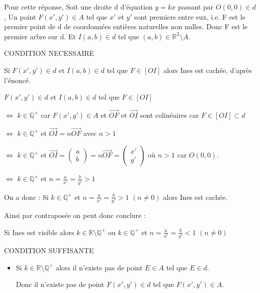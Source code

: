 \begin{tfjmenum}

Pour cette réponse,
Soit une droite d d'équation $y = kx$ passant par $O(0,0)\in d$,
Un point $F(x',y')\in A$ tel que $x'$ et $y'$ sont premiers entre eux, i.e. F est le premier point de d de coordonnées entières naturelles non nulles. Donc F est le premier arbre sur d.
Et $I(a,b)\in d$ tel que $(a,b)\in\mathbb{R}^2 \setminus A$.

\item

CONDITION NECESSAIRE

Si $F(x',y')\in d$ et $I(a,b)\in d$ tel que $F\in [OI]$ alors Ines est cachée, d'après l'énoncé.

$F(x',y')\in d$ et $I(a,b)\in d$ tel que $F\in [OI]$

$\Leftrightarrow$ $k\in \mathbb{Q}^+$ car $F(x',y')\in A$ et $\vec{OF}$ et $\vec{OI}$ sont colinéaires car $F\in [OI]\subset d$

$\Leftrightarrow$ $k\in \mathbb{Q}^+$ et $\vec{OI}=n\vec{OF}$ avec $n>1$

$\Leftrightarrow$ $k\in \mathbb{Q}^+$ et $\vec{OI}=\begin{pmatrix} a \\ b \end{pmatrix} = n\vec{OF}=\begin{pmatrix} x' \\ y' \end{pmatrix}$ où $n>1$ car $O(0,0)$.

$\Leftrightarrow$ $k\in \mathbb{Q}^+$ et $n=\frac{a}{x'}=\frac{b}{y'}>1$

On a donc :
Si $k\in \mathbb{Q}^+$ et $n=\frac{a}{x'}=\frac{b}{y'}>1$ $(n\neq 0)$ alors Ines est cachée.

Ainsi par contraposée on peut donc conclure :

Si Ines est visible alors $k\in \mathbb{R}\setminus \mathbb{Q}^+$ ou $k\in \mathbb{Q}^+$ et $n=\frac{a}{x'}=\frac{b}{y'}<1$ $(n\neq 0)$

\item

CONDITION SUFFISANTE

\begin{itemize}
    \item Si $k\in \mathbb{R} \setminus \mathbb{Q}^+$ alors il n'existe pas de point $E\in A$ tel que $E\in d$.

    Donc il n'existe pas de point $F(x',y')\in d$ tel que $F(x',y')\in A$.


\end{itemize}
\end{tfjmenum}
